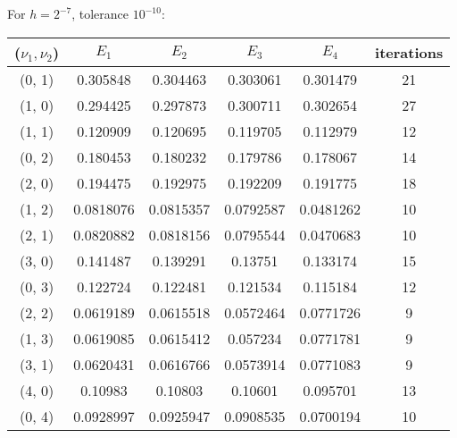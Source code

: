 \documentclass[12pt]{article}
\begin{document}
For $h=2^{-7}$, tolerance $10^{-10}$: \\
\begin{center}
\begin{tabular}{||c|cccc|c||}
\hline \hline
 ($\nu_1, \nu_2$)   & $E_1$ & $E_2$ &  $E_3$ & $E_4$ &   iterations \\
\hline \hline
 \color{red}(0, 1)   &  0.305848  &      0.304463  &      0.303061  &      0.301479  &  \color{red}21 \\
 (1, 0)   &  0.294425  &      0.297873  &      0.300711  &      0.302654  &           27 \\ \hline
 \color{red}(1, 1)   &  0.120909  &      0.120695  &      0.119705  &      0.112979  & \color{red}12 \\
 (0, 2)   &  0.180453  &      0.180232  &      0.179786  &      0.178067  &           14 \\
 (2, 0)   &  0.194475  &      0.192975  &      0.192209  &      0.191775  &           18 \\ \hline
 \color{red}(1, 2)   &  0.0818076 &      0.0815357 &      0.0792587 &      0.0481262 & \color{red}10 \\
 \color{red}(2, 1)   &  0.0820882 &      0.0818156 &      0.0795544 &      0.0470683 & \color{red}10 \\
 (3, 0)   &  0.141487  &      0.139291  &      0.13751   &      0.133174  &           15 \\
 (0, 3)   &  0.122724  &      0.122481  &      0.121534  &      0.115184  &           12 \\ \hline
 \color{red}(2, 2)   &  0.0619189 &      0.0615518 &      0.0572464 &      0.0771726 & \color{red}9 \\
 \color{red}(1, 3)   &  0.0619085 &      0.0615412 &      0.057234  &      0.0771781 &  \color{red}9 \\
 \color{red}(3, 1)   &  0.0620431 &      0.0616766 &      0.0573914 &      0.0771083 &  \color{red}9 \\
 (4, 0)   &  0.10983   &      0.10803   &      0.10601   &      0.095701  &           13 \\
 (0, 4)   &  0.0928997 &      0.0925947 &      0.0908535 &      0.0700194 &           10 \\
\hline \hline
\end{tabular}
\end{center}
\end{document}
